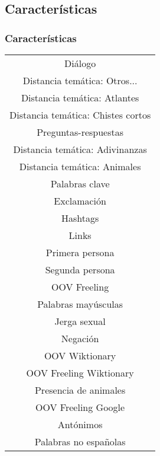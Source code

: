 \subsection{Características}
\begin{frame}[allowframebreaks]
    \frametitle{Características}

    \begin{center}
        \scriptsize
        \begin{tabular}{ c }
            Diálogo \\
            Distancia temática: Otros... \\
            Distancia temática: Atlantes \\
            Distancia temática: Chistes cortos \\
            Preguntas-respuestas \\
            Distancia temática: Adivinanzas \\
            Distancia temática: Animales \\
            Palabras clave \\
            Exclamación \\
            Hashtags \\
            Links \\
            Primera persona \\
            Segunda persona \\
            OOV Freeling \\
            Palabras mayúsculas \\
            Jerga sexual \\
            Negación \\
            OOV Wiktionary \\
            OOV Freeling Wiktionary \\
            Presencia de animales \\
            OOV Freeling Google \\
            Antónimos \\
            Palabras no españolas \\
        \end{tabular}
    \end{center}
\end{frame}

